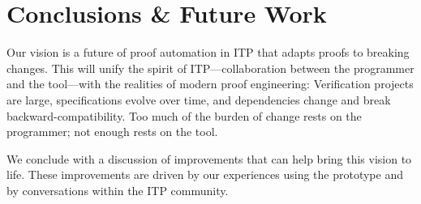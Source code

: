 \section{Conclusions \& Future Work}
\label{sec:future}

Our vision is a future of proof automation in ITP that 
adapts proofs to breaking changes. This will unify the spirit of ITP---collaboration
between the programmer and the tool---with the realities of modern proof engineering:
Verification projects are large, specifications evolve over time,
and dependencies change and break backward-compatibility. Too much of the burden
of change rests on the programmer; not enough rests on the tool.

We conclude with a discussion of improvements that can help bring this vision to life.
These improvements are driven by our experiences using the \sysname prototype
and by conversations within the ITP community.




